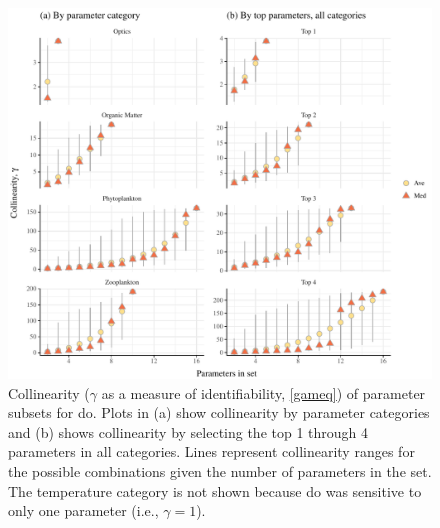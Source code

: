 \documentclass[preprint]{elsarticle}\usepackage[]{graphicx}\usepackage[]{color}
\makeatletter
\def\maxwidth{ %
  \ifdim\Gin@nat@width>\linewidth
    \linewidth
  \else
    \Gin@nat@width
  \fi
}
\makeatother
\begin{document}
\begin{figure}[!ht]

{\centering \includegraphics[width=\maxwidth]{figs/identplo-1} 

}

\caption{Collinearity ($\gamma$ as a measure of identifiability, \cref{gameq}) of parameter subsets for \ac{do}.  Plots in (a) show collinearity by parameter categories and (b) shows collinearity by selecting the top 1 through 4 parameters in all categories.  Lines represent collinearity ranges for the possible combinations given the number of parameters in the set.  The temperature category is not shown because \ac{do} was sensitive to only one parameter (i.e., $\gamma = 1$).}\label{fig:identplo}
\end{figure}
\end{document}
